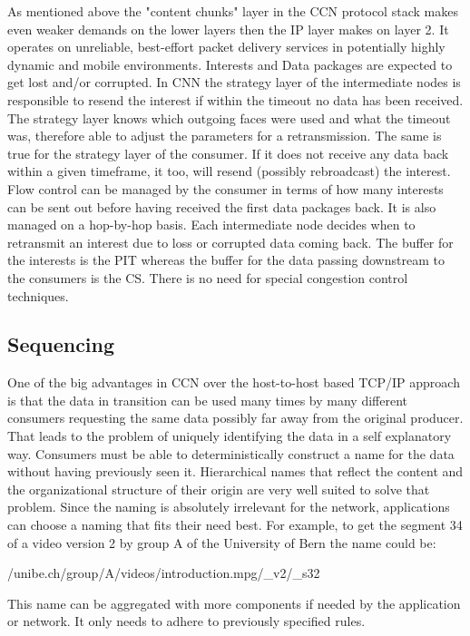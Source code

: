 As mentioned above the "content chunks" layer in the CCN protocol stack makes even weaker demands on the lower layers then the IP layer makes on layer 2. It operates on unreliable, best-effort packet delivery services in potentially highly dynamic and mobile environments. Interests and Data packages are expected to get lost and/or corrupted. In CNN the strategy layer of the intermediate nodes is responsible to resend the interest if within the timeout no data has been received. The strategy layer knows which outgoing faces were used and what the timeout was, therefore able to adjust the parameters for a retransmission. The same is true for the strategy layer of the consumer. If it does not receive any data back within a given timeframe, it too, will resend (possibly rebroadcast) the interest.
\\
Flow control can be managed by the consumer in terms of how many interests can be sent out before having received the first data packages back. It is also managed on a hop-by-hop basis. Each intermediate node decides when to retransmit an interest due to loss or corrupted data coming back. The buffer for the interests is the PIT whereas the buffer for the data passing downstream to the consumers is the CS. There is no need for special congestion control techniques.

\subsection{Sequencing}

One of the big advantages in CCN over the host-to-host based TCP/IP approach is that the data in transition can be used many times by many different consumers requesting the same data possibly far away from the original producer. That leads to the problem of uniquely identifying the data in a self explanatory way. Consumers must be able to deterministically construct a name for the data without having previously seen it. Hierarchical names that reflect the content and the organizational structure of their origin are very well suited to solve that problem. Since the naming is absolutely irrelevant for the network, applications can choose a naming that fits their need best. For example, to get the segment 34 of a video version 2 by group A of the University of Bern the name could be:

/unibe.ch/group/A/videos/introduction.mpg/_v2/_s32

This name can be aggregated with more components if needed by the application or network. It only needs to adhere to previously specified rules.


